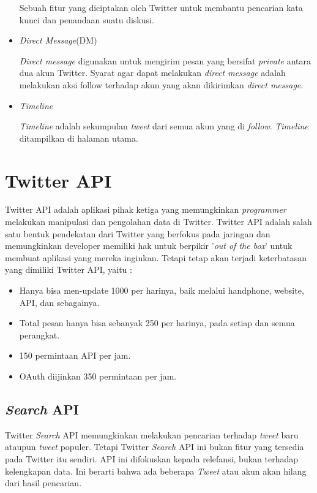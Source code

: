 \begin{itemize}
	Sebuah fitur yang diciptakan oleh Twitter untuk membantu pencarian kata kunci dan penandaan suatu diskusi.
	
	\item \textit{Direct Message}(DM)
	
	\textit{Direct message} digunakan untuk mengirim pesan yang bersifat \textit{private} antara dua akun Twitter. Syarat agar dapat melakukan \textit{direct message} adalah melakukan aksi follow terhadap akun yang akan dikirimkan \textit{direct message}.
	\item \textit{Timeline}
	
	\textit{Timeline} adalah sekumpulan \textit{tweet} dari semua akun yang di \textit{follow}. \textit{Timeline }ditampilkan di halaman utama.
\end{itemize}


\section{Twitter API}
Twitter API adalah aplikasi pihak ketiga yang memungkinkan \textit{programmer} melakukan manipulasi dan pengolahan data di Twitter. Twitter API adalah salah satu bentuk pendekatan dari Twitter yang berfokus pada jaringan dan memungkinkan developer memiliki hak untuk berpikir '\textit{out of the box}' untuk membuat aplikasi yang mereka inginkan. Tetapi tetap akan terjadi keterbatasan yang dimiliki Twitter API, yaitu :
\begin{itemize}
	\item Hanya bisa men-update 1000 per harinya, baik melalui handphone, website, API, dan sebagainya.
	\item Total pesan hanya bisa sebanyak 250 per harinya, pada setiap dan semua perangkat.
	\item 150 permintaan API per jam.
	\item OAuth diijinkan 350 permintaan per jam.
\end{itemize}

\subsection{\textit{Search} API}

Twitter \textit{Search} API memungkinkan melakukan pencarian terhadap \textit{tweet} baru ataupun \textit{tweet} populer. Tetapi Twitter \textit{Search} API ini bukan fitur yang tersedia pada Twitter itu sendiri. API ini difokuskan kepada relefansi, bukan terhadap kelengkapan data. Ini berarti bahwa ada beberapa \textit{Tweet} atau akun akan hilang dari hasil pencarian.

